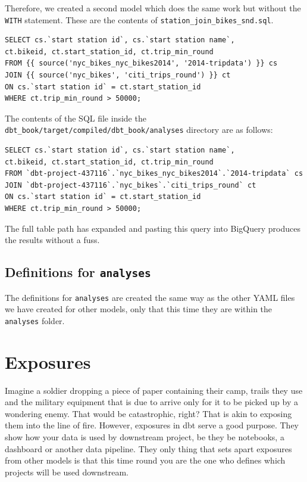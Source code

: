 \documentclass[
]{book}
\begin{document}
Therefore, we created a second model which does the same work but without the \texttt{WITH} statement. These are the contents of \texttt{station\_join\_bikes\_snd.sql}.

\begin{verbatim}
SELECT cs.`start station id`, cs.`start station name`, 
ct.bikeid, ct.start_station_id, ct.trip_min_round 
FROM {{ source('nyc_bikes_nyc_bikes2014', '2014-tripdata') }} cs 
JOIN {{ source('nyc_bikes', 'citi_trips_round') }} ct 
ON cs.`start station id` = ct.start_station_id
WHERE ct.trip_min_round > 50000;
\end{verbatim}

The contents of the SQL file inside the \texttt{dbt\_book/target/compiled/dbt\_book/analyses} directory are as follows:

\begin{verbatim}
SELECT cs.`start station id`, cs.`start station name`, 
ct.bikeid, ct.start_station_id, ct.trip_min_round 
FROM `dbt-project-437116`.`nyc_bikes_nyc_bikes2014`.`2014-tripdata` cs 
JOIN `dbt-project-437116`.`nyc_bikes`.`citi_trips_round` ct 
ON cs.`start station id` = ct.start_station_id
WHERE ct.trip_min_round > 50000;
\end{verbatim}

The full table path has expanded and pasting this query into BigQuery produces the results without a fuss.

\hypertarget{definitions-for-analyses}{%
\section{\texorpdfstring{Definitions for \texttt{analyses}}{Definitions for analyses}}\label{definitions-for-analyses}}

The definitions for \texttt{analyses} are created the same way as the other YAML files we have created for other models, only that this time they are within the \texttt{analyses} folder.

\hypertarget{exposures}{%
\chapter{Exposures}\label{exposures}}

Imagine a soldier dropping a piece of paper containing their camp, trails they use and the military equipment that is due to arrive only for it to be picked up by a wondering enemy. That would be catastrophic, right? That is akin to exposing them into the line of fire. However, exposures in dbt serve a good purpose. They show how your data is used by downstream project, be they be notebooks, a dashboard or another data pipeline. They only thing that sets apart exposures from other models is that this time round you are the one who defines which projects will be used downstream.
\end{document}
